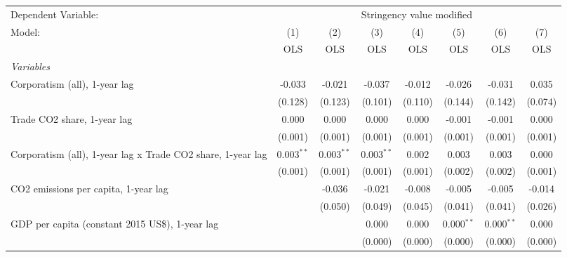 
\begingroup
\centering
\begin{tabular}{lccccccc}
   \toprule
   Dependent Variable: & \multicolumn{7}{c}{Stringency value modified}\\
   Model:                                                      & (1)          & (2)          & (3)          & (4)     & (5)           & (6)           & (7)\\  
                                                               &  OLS         & OLS          & OLS          & OLS     & OLS           & OLS           & OLS\\  
   \midrule
   \emph{Variables}\\
   Corporatism (all), 1-year lag                               & -0.033       & -0.021       & -0.037       & -0.012  & -0.026        & -0.031        & 0.035\\   
                                                               & (0.128)      & (0.123)      & (0.101)      & (0.110) & (0.144)       & (0.142)       & (0.074)\\   
   Trade CO2 share, 1-year lag                                 & 0.000        & 0.000        & 0.000        & 0.000   & -0.001        & -0.001        & 0.000\\   
                                                               & (0.001)      & (0.001)      & (0.001)      & (0.001) & (0.001)       & (0.001)       & (0.001)\\   
   Corporatism (all), 1-year lag x Trade CO2 share, 1-year lag & 0.003$^{**}$ & 0.003$^{**}$ & 0.003$^{**}$ & 0.002   & 0.003         & 0.003         & 0.000\\   
                                                               & (0.001)      & (0.001)      & (0.001)      & (0.001) & (0.002)       & (0.002)       & (0.001)\\   
   CO2 emissions per capita, 1-year lag                        &              & -0.036       & -0.021       & -0.008  & -0.005        & -0.005        & -0.014\\   
                                                               &              & (0.050)      & (0.049)      & (0.045) & (0.041)       & (0.041)       & (0.026)\\   
   GDP per capita (constant 2015 US\$), 1-year lag             &              &              & 0.000        & 0.000   & 0.000$^{**}$  & 0.000$^{**}$  & 0.000\\   
                                                               &              &              & (0.000)      & (0.000) & (0.000)       & (0.000)       & (0.000)\\   

\end{tabular}
